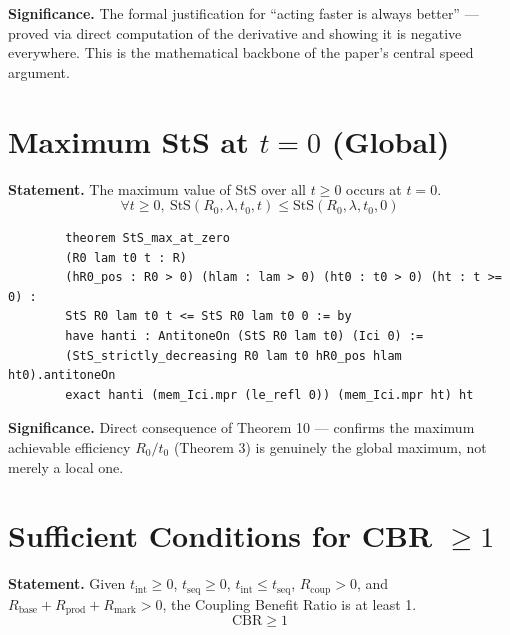 \documentclass[11pt,a4paper]{article}
\begin{document}
	\noindent\textbf{Significance.} The formal justification for ``acting faster is always better'' --- proved via direct computation of the derivative and showing it is negative everywhere. This is the mathematical backbone of the paper's central speed argument.
	
	\section{Maximum StS at $t = 0$ (Global)}
	
	\textbf{Statement.} The maximum value of StS over all $t \geq 0$ occurs at $t = 0$.
	\begin{equation}
		\forall t \geq 0,\ \text{StS}(R_0,\lambda,t_0,t) \leq \text{StS}(R_0,\lambda,t_0,0)
	\end{equation}
	
	\begin{lstlisting}
		theorem StS_max_at_zero
		(R0 lam t0 t : R)
		(hR0_pos : R0 > 0) (hlam : lam > 0) (ht0 : t0 > 0) (ht : t >= 0) :
		StS R0 lam t0 t <= StS R0 lam t0 0 := by
		have hanti : AntitoneOn (StS R0 lam t0) (Ici 0) :=
		(StS_strictly_decreasing R0 lam t0 hR0_pos hlam ht0).antitoneOn
		exact hanti (mem_Ici.mpr (le_refl 0)) (mem_Ici.mpr ht) ht
	\end{lstlisting}
	
	\noindent\textbf{Significance.} Direct consequence of Theorem 10 --- confirms the maximum achievable efficiency $R_0/t_0$ (Theorem 3) is genuinely the global maximum, not merely a local one.
	
	\section{Sufficient Conditions for CBR $\geq 1$}
	
	\textbf{Statement.} Given $t_{\text{int}} \geq 0$, $t_{\text{seq}} \geq 0$, $t_{\text{int}} \leq t_{\text{seq}}$, $R_{\text{coup}} > 0$, and $R_{\text{base}}+R_{\text{prod}}+R_{\text{mark}} > 0$, the Coupling Benefit Ratio is at least 1.
	\begin{equation}
		\text{CBR} \geq 1
	\end{equation}
	
\end{document}
